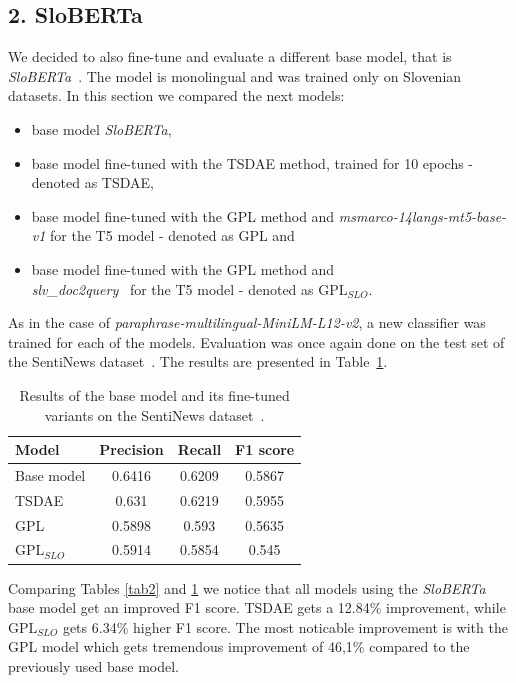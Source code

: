 \documentclass[fleqn,moreauthors,10pt]{ds_report}
\begin{document}
\subsection*{\large{2. SloBERTa}}
We decided to also fine-tune and evaluate a different base model, that is {\it SloBERTa}~\cite{sloberta}. The model is monolingual and was trained only on Slovenian datasets. In this section we compared the next models:
\begin{itemize}
	\item base model {\it SloBERTa},
	\item base model fine-tuned with the TSDAE method, trained for 10 epochs - denoted as TSDAE,
	\item base model fine-tuned with the GPL method and {\it msmarco-14langs-mt5-base-v1} \cite{msmarco14langs} for the T5 model - denoted as GPL and
	\item base model fine-tuned with the GPL method and \\{\it slv\_doc2query}~\cite{boshko} for the T5 model - denoted as $\text{GPL}_{SLO}$.
\end{itemize}

As in the case of {\it paraphrase-multilingual-MiniLM-L12-v2}, a new classifier was trained for each of the models. Evaluation was once again done on the test set of the SentiNews dataset~\cite{sentiNews}. The results are presented in Table~\ref{tab4}.

\begin{table}[!h]
	\footnotesize
	\begin{center}
		\begin{tabular}{ |l|c|c|c| }
		\hline
		\rowcolor{Blue}Model & Precision & Recall & F1 score\\
		\hline

		Base model & 0.6416 & 0.6209 & 0.5867\\
		\hline
		TSDAE & 0.631 & 0.6219 & 0.5955\\
		\hline
		GPL & 0.5898 & 0.593 & 0.5635\\
		$\text{GPL}_{SLO}$ & 0.5914 & 0.5854 & 0.545\\

		\hline
		\end{tabular}
	\end{center}
\caption{Results of the base model and its fine-tuned variants on the SentiNews dataset~\cite{sentiNews}.}
\label{tab4}
\end{table}

Comparing Tables \ref*{tab2} and \ref*{tab4} we notice that all models using the {\it SloBERTa} base model get an improved F1 score. TSDAE gets a 12.84\% improvement, while $\text{GPL}_{SLO}$ gets 6.34\% higher F1 score. The most noticable improvement is with the GPL model which gets tremendous improvement of 46,1\% compared to the previously used base model.
\end{document}
